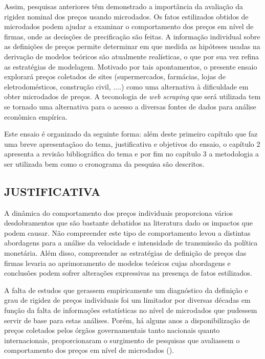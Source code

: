 \documentclass[twoside,a4paper,11pt]{report}
\begin{document}
Assim, pesquisas anteriores têm demonstrado a importância da avaliação da rigidez nominal dos preços usando microdados. Os fatos estilizados obtidos de microdados podem ajudar a examinar o comportamento dos preços em nível de firmas, onde as decisções de precificação são feitas. A informação individual sobre as definições de preços permite determinar em que medida as hipóteses usadas na derivação de modelos teóricos são atualmente realísticas, o que por sua vez refina as estratégias de modelagem. Motivado por tais apontamentos, o presente ensaio explorará preços coletados de sites (supermercados, farmácias, lojas de eletrodomésticos, construção civil, ....) como uma alternativa à dificuldade em obter microdados de preços. A teconologia de \emph{web scraping} que será utilizada tem se tornado uma alternativa para o acesso a diversas fontes de dados para análise econômica empírica. 

Este ensaio é organizado da seguinte forma: além deste primeiro capítulo que faz uma breve apresentaçãoo do tema, justificativa e objetivos do ensaio, o capítulo 2 apresenta a revisão bibliográfica do tema e por fim no capítulo 3 a metodologia a ser utilizada bem como o cronograma da pesquisa são descritos.

\subsection*{JUSTIFICATIVA}

A dinâmica do comportamento dos preços individuais proporciona vários desdobramentos que são bastante debatidos na literatura dado os impactos que podem causar. Não compreender este tipo de comportamento levou a distintas abordagens para a análise da velocidade e intensidade de transmissão da política monetária. Além disso, compreender as estratégias de definição de preços das firmas levaria ao aprimoramento de modelos teóricos cujas abordagens e conclusões podem sofrer alterações expressivas na presença de fatos estilizados. 

A falta de estudos que gerassem empiricamente um diagnóstico da definição e grau de rigidez de preços individuais foi um limitador por diversas décadas em função da falta de informações estatísticas no nível de microdados que pudessem servir de base para estas análises. Porém, há alguns anos a disponibilização de preços coletados pelos órgãos governamentais tanto nacionais quanto internacionais, proporcionaram o surgimento de pesquisas que avaliassem o comportamento dos preços em nível de microdados (\citet{bils2004some,nakamura2008five,klenow2008state,dhyne2006price,gouvea2007nominal,matos2009comportamento,lopes2008rigidez,bunn2012examining}). 
\end{document}
